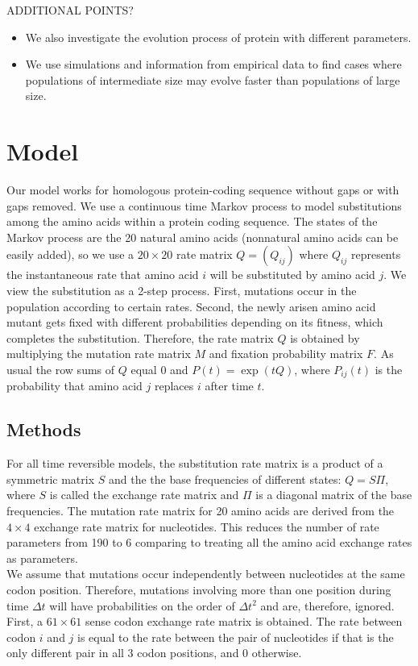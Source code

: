 \documentclass[13pt]{article}
\begin{document}
ADDITIONAL POINTS?
\begin{itemize}
\item We also investigate the evolution process of protein with different parameters.
\item We use simulations and information from empirical data to find cases where populations of intermediate size may evolve faster than populations of large size.
\end{itemize}


\section{Model}
Our model works for homologous protein-coding sequence without gaps or with gaps removed.
We use a continuous time Markov process to model substitutions among the amino acids within a protein coding sequence.
The states of the Markov process are the 20 natural amino acids (nonnatural amino acids can be easily added), so we use a $20 \times 20$ rate matrix $Q=(Q_{ij})$ where $Q_{ij}$ represents the instantaneous rate that amino acid $i$ will be substituted by amino acid $j$.
We view the substitution as a 2-step process.
First, mutations occur in the population according to certain rates.
Second, the newly arisen amino acid mutant gets fixed with different probabilities depending on its fitness, which completes the substitution.
Therefore, the rate matrix $Q$ is obtained by multiplying the mutation rate matrix $M$ and fixation probability matrix $F$.
As usual the row sums of $Q$ equal $0$ and $P(t) = \exp (tQ)$, where $P_{ij}(t)$ is the probability that amino acid $j$ replaces $i$ after time $t$.\\

\subsection{Methods}
For all time reversible models, the substitution rate matrix is a product of a symmetric matrix $S$ and the the base frequencies of different states: $Q = S\Pi$, where $S$ is called the exchange rate matrix and $\Pi$ is a diagonal matrix of the base frequencies.
The mutation rate matrix for 20 amino acids are derived from the $4 \times 4 $ exchange rate matrix for nucleotides.
This reduces the number of rate parameters from 190 to 6 comparing to treating all the amino acid exchange rates as parameters.\\

We assume that mutations occur independently between nucleotides at the same codon position.
Therefore, mutations involving more than one position during time $\Delta t$ will have probabilities on the order of $\Delta t^2$ and are, therefore, ignored.
First, a $61 \times 61$ sense codon exchange rate matrix is obtained.
The rate between codon $i$ and $j$ is equal to the rate between the pair of nucleotides if that is the only different pair in all 3 codon positions, and 0 otherwise.\\
\end{document}
